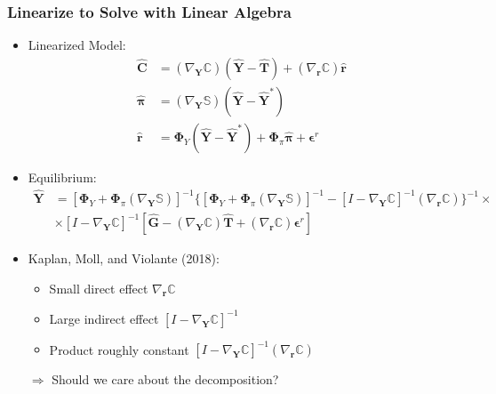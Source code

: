 \documentclass[english,xcolor=svgnames]{beamer}
\begin{document}
\begin{frame}
    \frametitle{Linearize to Solve with Linear Algebra}
    \begin{itemize}
        \item Linearized Model:
        \begin{align*}
            \bm{\hat{C}} &= (\nabla_{\bm{Y}}\pmb{\mathbb{C}}) (\bm{\hat{Y}} - \bm{\hat{T}}) + (\nabla_{\bm{r}}\pmb{\mathbb{C}})\bm{\hat{r}} \\
            \bm{\hat{\pi}} &= (\nabla_{\bm{Y}}\pmb{\mathbb{S}})(\bm{\hat{Y}} - \bm{\hat{Y}}^*)  \\
            \bm{\hat{r}} &= \bm{\Phi}_Y (\bm{\hat{Y}} - \bm{\hat{Y}}^*) +  \bm{\Phi}_\pi \bm{\hat{\pi}} + \bm{\epsilon}^r 
        \end{align*}
        \item Equilibrium:
         \begin{align*}
             \bm{\hat{Y}} &=  [ \bm{\Phi}_Y  +  \bm{\Phi}_\pi (\nabla_{\bm{Y}}\pmb{\mathbb{S}}) ]^{-1} \{[ \bm{\Phi}_Y  +  \bm{\Phi}_\pi (\nabla_{\bm{Y}}\pmb{\mathbb{S}}) ]^{-1} - [I - \nabla_{\bm{Y}}\pmb{\mathbb{C}}]^{-1}(\nabla_{\bm{r}}\pmb{\mathbb{C}})  \}^{-1}  \times\\ 
             &\times[I - \nabla_{\bm{Y}}\pmb{\mathbb{C}}]^{-1} [\bm{\hat{G}} - (\nabla_{\bm{Y}}\pmb{\mathbb{C}})\bm{\hat{T}} + (\nabla_{\bm{r}}\pmb{\mathbb{C}})\bm{\epsilon}^r ]  
         \end{align*}
         \item Kaplan, Moll, and Violante (2018):
         \begin{itemize}
         	\item Small direct effect $\nabla_{\bm{r}}\pmb{\mathbb{C}}$
         	\item Large indirect effect $[I - \nabla_{\bm{Y}}\pmb{\mathbb{C}}]^{-1}$
         	\item Product roughly constant $[I - \nabla_{\bm{Y}}\pmb{\mathbb{C}}]^{-1}(\nabla_{\bm{r}}\pmb{\mathbb{C}})$
         \end{itemize}
         \item[$\Rightarrow$] Should we care about the decomposition?
    \end{itemize}
\end{frame}
\end{document}

